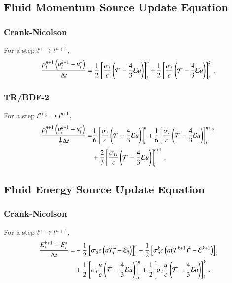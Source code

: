 \documentclass[preprint,12pt]{elsarticle}
\begin{document}
\subsection{Fluid Momentum Source Update Equation}
\subsubsection{Crank-Nicolson}
For a step $t^n\rightarrow t^{n+1}$,
\begin{equation}
  \frac{\rho_i^{n+1}\left(u_i^{k+1}-u_i^*\right)}{\dt} = 
   \half\left[\frac{\sigma_{t}}{c}\left(\F-\frac{4}{3}\E u\right)\right]_i^n
  +\half\left[\frac{\sigma_{t}}{c}\left(\F-\frac{4}{3}\E u\right)\right]_i^k
  \pep
\lequ{hydromCNfull}
\end{equation}

\subsubsection{TR/BDF-2}
For a step $t^{n+\frac{1}{2}}\rightarrow t^{n+1}$,
\begin{equation}\begin{split}
  \frac{\rho_i^{n+1}\left(u_i^{k+1}-u_i^*\right)}{\half\dt} =  
  & \sixth\left[\frac{\sigma_{t}}{c}\left(\F-\frac{4}{3}\E u\right)\right]_i^n
   +\sixth\left[\frac{\sigma_{t}}{c}\left(\F-\frac{4}{3}\E u\right)\right]_i^{n+\half}\\
  &+\frac{2}{3}\left[\frac{\sigma_{t,i}}{c}\left(\F-\frac{4}{3}\E u\right)\right]_i^{k+1}
  \pep
\lequ{hydromBDF2full}
\end{split}\end{equation}

\subsection{Fluid Energy Source Update Equation}
\subsubsection{Crank-Nicolson}
For a step $t^n\rightarrow t^{n+1}$,
\begin{equation}\begin{split}
  \frac{E_i^{k+1}-E_i^*}{\dt} = &
  -\half\left[\sigma_{a} c\left(aT_i^4 - \E_i\right)\right]_i^n
  -\half\left[\sigma_{a}^k c\left(a(T^{k+1})^4 - \E^{k+1}\right)\right]_i\\
  &+\half\left[\sigma_{t}\frac{u}{c}\left(\F-\frac{4}{3}\E u\right)\right]_i^n
   +\half\left[\sigma_{t}\frac{u}{c}\left(\F-\frac{4}{3}\E u\right)\right]_i^k
  \pep
\lequ{hydroECNfull}
\end{split}\end{equation}
\end{document}
